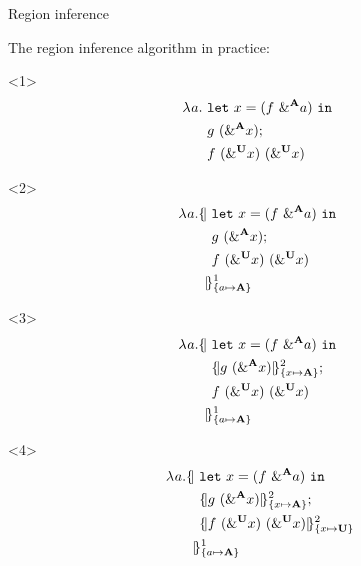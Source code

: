 \documentclass[xcolor=svgnames,11pt]{beamer}
\begin{document}
\begin{frame}[fragile]{Region inference}

  The region inference algorithm in practice:
  \setlength{\jot}{-1pt}
  \begin{onlyenv}<1>
    \begin{align*}
      \lam{a}{}\ %
      &\letin{x}{\app{f}{\borrow[\kaff]{a}}}{}\\
      &g\ (\borrow[\kaff]{x});\\
      &f\ (\borrow[\kun]{x})\ (\borrow[\kun]{x})\\
    \end{align*}
  \end{onlyenv}
  \begin{onlyenv}<2>
    \begin{align*}
      \lam{a}{}\region[1]{\Sone a\MBORROW}{\ %
      &\letin{x}{\app{f}{\borrow[\kaff]{a}}}{}\\
      &g\ (\borrow[\kaff]{x});\\
      &f\ (\borrow[\kun]{x})\ (\borrow[\kun]{x})\\
      &\!\!\!}
    \end{align*}
  \end{onlyenv}
  \begin{onlyenv}<3>
    \begin{align*}
      \lam{a}{}\region[1]{\Sone a\MBORROW}{\ %
      &\letin{x}{\app{f}{\borrow[\kaff]{a}}}{}\\
      &\region[2]{\Sone x\MBORROW}{g\ (\borrow[\kaff]{x})};\\
      &f\ (\borrow[\kun]{x})\ (\borrow[\kun]{x})\\
      &\!\!\!}
    \end{align*}
  \end{onlyenv}
  \begin{onlyenv}<4>
    \begin{align*}
      \lam{a}{}\region[1]{\Sone a\MBORROW}{\ %
      &\letin{x}{\app{f}{\borrow[\kaff]{a}}}{}\\
      &\region[2]{\Sone x\MBORROW}{g\ (\borrow[\kaff]{x})};\\
      &\region[2]{\Sone x\IBORROW}{f\ (\borrow[\kun]{x})\ (\borrow[\kun]{x})}\\
      &\!\!\!}
    \end{align*}
  \end{onlyenv}
\end{frame}
\end{document}
